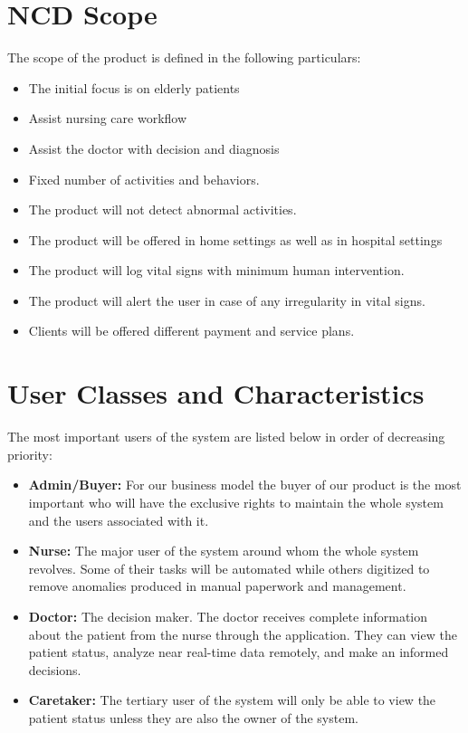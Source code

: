 \section{NCD Scope}
The scope of the product is defined in the following particulars:
\begin{itemize}
    \item The initial focus is on elderly patients
    \item Assist nursing care workflow
    \item Assist the doctor with decision and diagnosis
    \item Fixed number of activities and behaviors.
    \item The product will not detect abnormal activities.
    \item The product will be offered in home settings as well as in hospital settings
    \item The product will log vital signs with minimum human intervention.
    \item The product will alert the user in case of any irregularity in vital signs.
    \item Clients will be offered different payment and service plans.
\end{itemize}
\section{User Classes and Characteristics}
The most important users of the system are listed below in order of decreasing priority:
\begin{itemize}
    \item \textbf{Admin/Buyer:} For our business model the buyer of our product is the most important who will have the exclusive rights to maintain the whole system and the users associated with it.
    \item \textbf{Nurse:} The major user of the system around whom the whole system revolves. Some of their tasks will be automated while others digitized to remove anomalies produced in manual paperwork and management.
    \item \textbf{Doctor:} The decision maker. The doctor receives complete information about the patient from the nurse through the application. They can view the patient status, analyze near real-time data remotely, and make an informed decisions.
    \item \textbf{Caretaker:} The tertiary user of the system will only be able to view the patient status unless they are also the owner of the system.

\end{itemize}

